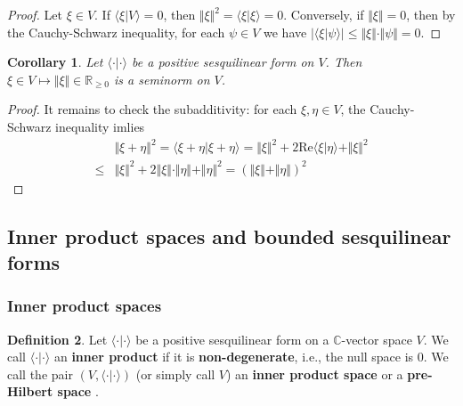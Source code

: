 \documentclass[12pt,b5paper,notitlepage]{article}
\theoremstyle{definition}
\newtheorem{df}{Definition}[subsection]
\theoremstyle{plain}
\newtheorem{co}[df]{Corollary}
\newcommand{\bk}[1]{\langle {#1}\rangle}
\newcommand{\Cbb}{\mathbb C}
\newcommand{\Rbb}{\mathbb R}
\newcommand{\Real}{\mathrm{Re}}
\numberwithin{equation}{section}
\begin{document}
\begin{proof}
Let $\xi\in V$. If $\bk{\xi|V}=0$, then $\Vert \xi\Vert^2=\bk{\xi|\xi}=0$. Conversely, if $\Vert \xi\Vert=0$, then by the Cauchy-Schwarz inequality, for each $\psi\in V$ we have $|\bk{\xi|\psi}|\leq \Vert \xi\Vert\cdot\Vert\psi\Vert=0$.
\end{proof}





\begin{co}\label{lb115}
Let $\bk{\cdot|\cdot}$ be a positive sesquilinear form on $V$. Then $\xi\in V\mapsto\Vert \xi\Vert\in\Rbb_{\geq0}$ is a seminorm on $V$. 
\end{co}

\begin{proof}
It remains to check the subadditivity: for each $\xi,\eta\in V$, the Cauchy-Schwarz inequality imlies
\begin{align*}
&\Vert \xi+\eta\Vert^2=\bk{\xi+\eta|\xi+\eta}=\Vert \xi\Vert^2+2\Real\bk{\xi|\eta}+\Vert \xi\Vert^2\\
\leq& \Vert \xi\Vert^2+2\Vert \xi\Vert\cdot\Vert \eta\Vert+\Vert \eta\Vert^2=(\Vert \xi\Vert+\Vert \eta\Vert)^2
\end{align*}
\end{proof}






\subsection{Inner product spaces and bounded sesquilinear forms}




\subsubsection{Inner product spaces}




\begin{df}
Let $\bk{\cdot|\cdot}$ be a positive sesquilinear form on a $\Cbb$-vector space $V$. We call $\bk{\cdot|\cdot}$ an \textbf{inner product}  if it is  \textbf{non-degenerate}, i.e., the null space is $0$.  We call the pair $(V,\bk{\cdot|\cdot})$ (or simply call $V$) an \textbf{inner product space} or a \textbf{pre-Hilbert space} .
\end{df}
\end{document}
